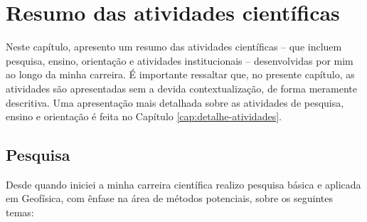 \renewcommand{\chaptername}{Capítulo}
\chapter{Resumo das atividades científicas}
\renewcommand{\chaptername}{Resumo das atividades científicas}
\label{cap:resumo-atividades}

Neste capítulo, apresento um resumo das atividades científicas -- que incluem pesquisa, 
ensino, orientação e atividades institucionais -- desenvolvidas por mim ao longo da minha
carreira. É importante ressaltar que, no presente capítulo,
as atividades são apresentadas sem a devida contextualização, de forma meramente 
descritiva. Uma apresentação mais detalhada sobre as atividades de pesquisa, ensino e
orientação é feita no Capítulo \ref{cap:detalhe-atividades}.


\section{Pesquisa}
\label{sec:pesquisa}

Desde quando iniciei a minha carreira científica realizo pesquisa básica e aplicada em
Geofísica, com ênfase na área de métodos potenciais, sobre os seguintes temas:

